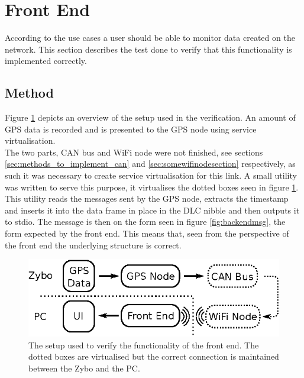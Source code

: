 
\section{Front End}
\label{sec:frontendverification}
According to the use cases a user should be able to monitor data created on the network.
This section describes the test done to verify that this functionality is implemented correctly.
\subsection{Method}
Figure \ref{fig:frontendsetup} depicts an overview of the setup used in the verification.
An amount of GPS data is recorded and is presented to the GPS node using service virtualisation.\\

The two parts, CAN bus and WiFi node were not finished, see sections \ref{sec:methods_to_implement_can} and \ref{sec:somewifinodesection} respectively, as such it was necessary to create service virtualisation for this link.
A small utility was written to serve this purpose, it virtualises the dotted boxes seen in figure \ref{fig:frontendsetup}.
This utility reads the messages sent by the GPS node, extracts the timestamp and inserts it into the data frame in place in the DLC nibble and then outputs it to stdio.
The message is then on the form seen in figure \ref{fig:backendmsg}, the form expected by the front end.
This means that, seen from the perspective of the front end the underlying structure is correct.

\begin{figure}
	\centering
	\includegraphics[width=.65\linewidth]{graphics/frontend_verification}
	\caption[The setup used to verify the functionality of the front end.]{The setup used to verify the functionality of the front end. 
	The dotted boxes are virtualised but the correct connection is maintained between the Zybo and the PC.}
	\label{fig:frontendsetup}
\end{figure}


